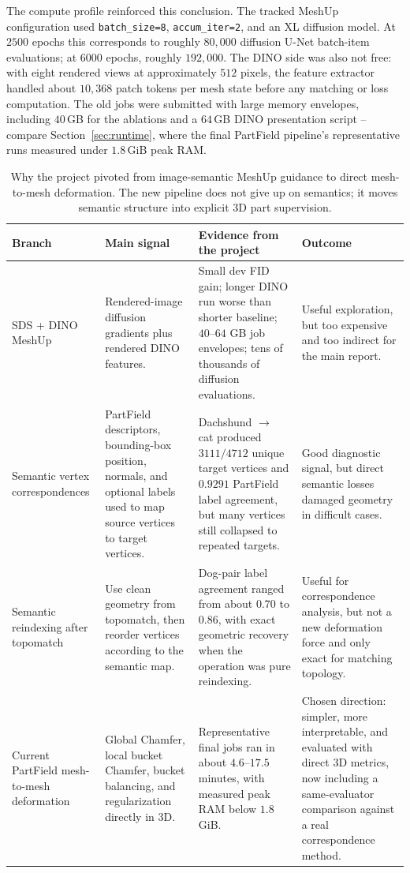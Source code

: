 \documentclass{article}
\begin{document}
The compute profile reinforced this conclusion. The tracked MeshUp configuration used
\texttt{batch\_size=8}, \texttt{accum\_iter=2}, and an XL diffusion model. At $2500$ epochs this
corresponds to roughly $80{,}000$ diffusion U-Net batch-item evaluations; at $6000$ epochs, roughly
$192{,}000$. The DINO side was also not free: with eight rendered views at approximately $512$
pixels, the feature extractor handled about $10{,}368$ patch tokens per mesh state before any
matching or loss computation. The old jobs were submitted with large memory envelopes, including
$40$\,GB for the ablations and a $64$\,GB DINO presentation script -- compare Section~\ref{sec:runtime}, where
the final PartField pipeline's representative runs measured under $1.8$\,GiB peak RAM.

\begin{table}[H]
\centering
\small
\begin{tabularx}{\textwidth}{>{\raggedright\arraybackslash}p{}XXX}
\toprule
Branch & Main signal & Evidence from the project & Outcome \\
\midrule
SDS + DINO MeshUp &
Rendered-image diffusion gradients plus rendered DINO features. &
Small dev FID gain; longer DINO run worse than shorter baseline; $40$--$64$ GB job envelopes;
tens of thousands of diffusion evaluations. &
Useful exploration, but too expensive and too indirect for the main report. \\
Semantic vertex correspondences &
PartField descriptors, bounding-box position, normals, and optional labels used to map source
vertices to target vertices. &
Dachshund $\rightarrow$ cat produced $3111/4712$ unique target vertices and $0.9291$ PartField
label agreement, but many vertices still collapsed to repeated targets. &
Good diagnostic signal, but direct semantic losses damaged geometry in difficult cases. \\
Semantic reindexing after topomatch &
Use clean geometry from topomatch, then reorder vertices according to the semantic map. &
Dog-pair label agreement ranged from about $0.70$ to $0.86$, with exact geometric recovery when the
operation was pure reindexing. &
Useful for correspondence analysis, but not a new deformation force and only exact for matching
topology. \\
Current PartField mesh-to-mesh deformation &
Global Chamfer, local bucket Chamfer, bucket balancing, and regularization directly in 3D. &
Representative final jobs ran in about $4.6$--$17.5$ minutes, with measured peak RAM below
$1.8$ GiB. &
Chosen direction: simpler, more interpretable, and evaluated with direct 3D metrics, now including
a same-evaluator comparison against a real correspondence method. \\
\bottomrule
\end{tabularx}
\caption{Why the project pivoted from image-semantic MeshUp guidance to direct mesh-to-mesh
deformation. The new pipeline does not give up on semantics; it moves semantic structure into
explicit 3D part supervision.}
\label{tab:appendix-pivot}
\end{table}
\end{document}
